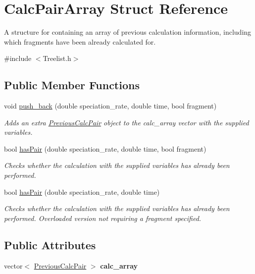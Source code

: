 \hypertarget{struct_calc_pair_array}{}\section{Calc\+Pair\+Array Struct Reference}
\label{struct_calc_pair_array}


A structure for containing an array of previous calculation information, including which fragments have been already calculated for.  




{\ttfamily \#include $<$Treelist.\+h$>$}

\subsection*{Public Member Functions}
\begin{DoxyCompactItemize}
\item 
void \hyperlink{struct_calc_pair_array_aa7f2b05011b4ecfe24883b0339719cad}{push\+\_\+back} (double speciation\+\_\+rate, double time, bool fragment)
\begin{DoxyCompactList}\small\item\em Adds an extra \hyperlink{struct_previous_calc_pair}{Previous\+Calc\+Pair} object to the calc\+\_\+array vector with the supplied variables. \end{DoxyCompactList}\item 
bool \hyperlink{struct_calc_pair_array_ad1f32ef67026e93e8e96b81c2c918d81}{has\+Pair} (double speciation\+\_\+rate, double time, bool fragment)
\begin{DoxyCompactList}\small\item\em Checks whether the calculation with the supplied variables has already been performed. \end{DoxyCompactList}\item 
bool \hyperlink{struct_calc_pair_array_a742d2dbdab8d4e3a2bdfa6338736c377}{has\+Pair} (double speciation\+\_\+rate, double time)
\begin{DoxyCompactList}\small\item\em Checks whether the calculation with the supplied variables has already been performed. Overloaded version not requiring a fragment specified. \end{DoxyCompactList}\end{DoxyCompactItemize}
\subsection*{Public Attributes}
\begin{DoxyCompactItemize}
\item 
vector$<$ \hyperlink{struct_previous_calc_pair}{Previous\+Calc\+Pair} $>$ {\bfseries calc\+\_\+array}\hypertarget{struct_calc_pair_array_aeb7d5982010c0be9e5737eda2ca4f925}{}\label{struct_calc_pair_array_aeb7d5982010c0be9e5737eda2ca4f925}

\end{DoxyCompactItemize}


